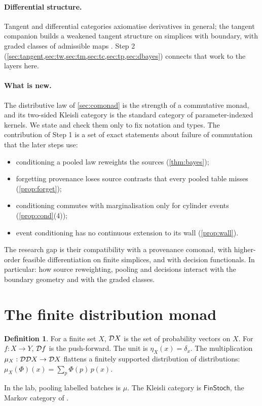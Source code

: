 \documentclass[11pt]{article}
\theoremstyle{definition}\newtheorem{definition}[theorem]{Definition}\newtheorem{remark}[theorem]{Remark}\newtheorem{example}[theorem]{Example}
\begin{document}
\paragraph{Differential structure.} Tangent and differential categories axiomatise derivatives in general; the tangent companion builds a
weakened tangent structure on simplices with boundary, with graded classes of admissible maps \cite{TangentCompanion}. Step 2
(\cref{sec:tangent,sec:tw,sec:tm,sec:tc,sec:tp,sec:dbayes}) connects that work to the layers here.

\paragraph{What is new.} The distributive law of \cref{sec:comonad} is the strength of a commutative monad, and its two-sided Kleisli
category is the standard category of parameter-indexed kernels. We state and check them only to fix notation and types. The contribution of
Step 1 is a set of exact statements about failure of commutation that the later steps use:
\begin{itemize}
\item conditioning a pooled law reweights the sources (\cref{thm:bayes});
\item forgetting provenance loses source contrasts that every pooled table misses (\cref{prop:forget});
\item conditioning commutes with marginalisation only for cylinder events (\cref{prop:cond}(4));
\item event conditioning has no continuous extension to its wall (\cref{prop:wall}).
\end{itemize}
The research gap is their compatibility with a provenance comonad, with higher-order feasible differentiation on finite simplices, and
with decision functionals. In particular: how source reweighting, pooling and decisions interact with the boundary geometry and with the
graded classes.

\section{The finite distribution monad}\label{sec:monad}
\begin{definition}\label{def:monad}
For a finite set $X$, $\mathcal D X$ is the set of probability vectors on $X$. For $f:X\to Y$, $\mathcal D f$ is the push-forward. The unit is
$\eta_X(x)=\delta_x$. The multiplication $\mu_X:\mathcal D\mathcal D X\to\mathcal D X$ flattens a finitely supported distribution of distributions:
$\mu_X(\Phi)(x)=\sum_p\Phi(p)\,p(x)$.
\end{definition}
In the lab, pooling labelled batches is $\mu$. The Kleisli category is $\mathsf{FinStoch}$, the Markov category of
\cite[Section ``Markov categories'']{Lab}.
\end{document}
